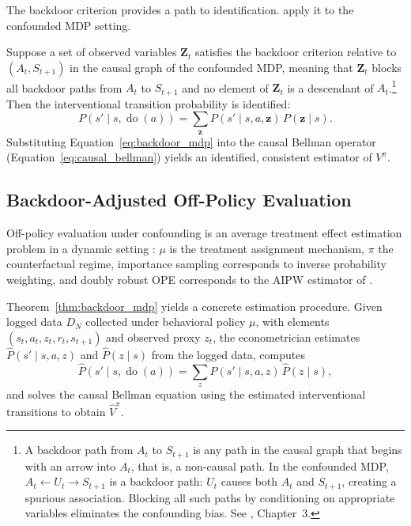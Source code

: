 The backdoor criterion \citep{pearl2009causality} provides a path to identification. \citet{zhang2020causal} apply it to the confounded MDP setting.

\begin{theorem}
\label{thm:backdoor_mdp}
Suppose a set of observed variables $\mathbf{Z}_t$ satisfies the backdoor criterion relative to $(A_t, S_{t+1})$ in the causal graph of the confounded MDP, meaning that $\mathbf{Z}_t$ blocks all backdoor paths from $A_t$ to $S_{t+1}$ and no element of $\mathbf{Z}_t$ is a descendant of $A_t$.\footnote{A backdoor path from $A_t$ to $S_{t+1}$ is any path in the causal graph that begins with an arrow into $A_t$, that is, a non-causal path. In the confounded MDP, $A_t \leftarrow U_t \rightarrow S_{t+1}$ is a backdoor path: $U_t$ causes both $A_t$ and $S_{t+1}$, creating a spurious association. Blocking all such paths by conditioning on appropriate variables eliminates the confounding bias. See \citet{pearl2009causality}, Chapter~3.} Then the interventional transition probability is identified:
\begin{equation}
P(s' \mid s, \operatorname{do}(a)) = \sum_{\mathbf{z}} P(s' \mid s, a, \mathbf{z}) \, P(\mathbf{z} \mid s).
\label{eq:backdoor_mdp}
\end{equation}
Substituting Equation~\eqref{eq:backdoor_mdp} into the causal Bellman operator (Equation~\ref{eq:causal_bellman}) yields an identified, consistent estimator of $V^\pi$.
\end{theorem}

\subsection{Backdoor-Adjusted Off-Policy Evaluation}
\label{subsec:backdoor_ope}

Off-policy evaluation under confounding is an average treatment effect estimation problem in a dynamic setting \citep{bannon2020causality}: $\mu$ is the treatment assignment mechanism, $\pi$ the counterfactual regime, importance sampling corresponds to inverse probability weighting, and doubly robust OPE corresponds to the AIPW estimator of \citet{robins1994estimation}.

Theorem~\ref{thm:backdoor_mdp} yields a concrete estimation procedure. Given logged data $D_N$ collected under behavioral policy $\mu$, with elements $(s_t, a_t, z_t, r_t, s_{t+1})$ and observed proxy $z_t$, the econometrician estimates $\hat{P}(s' \mid s, a, z)$ and $\hat{P}(z \mid s)$ from the logged data, computes
\begin{equation}
\hat{P}(s' \mid s, \operatorname{do}(a)) = \sum_{z} \hat{P}(s' \mid s, a, z) \, \hat{P}(z \mid s),
\label{eq:backdoor_estimator}
\end{equation}
and solves the causal Bellman equation using the estimated interventional transitions to obtain $\hat{V}^\pi$.

